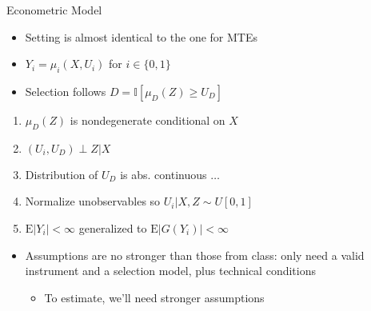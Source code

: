 \documentclass{beamer}
\newcommand{\E}{\mathrm{E}} %
\begin{document}
\begin{frame}{Econometric Model} %

\begin{itemize}

\item Setting is almost identical to the one for MTEs

\item $Y_i = \mu_i(X, U_i)$ for $i \in \{0, 1\}$

\item Selection follows $D = \mathbb{I}[ \mu_D(Z) \geq U_D ]$

\end{itemize}

\pause

\begin{enumerate}

\item $\mu_D(Z)$ is nondegenerate conditional on $X$

\item $(U_i, U_D) \perp Z | X$

\item Distribution of $U_D$ is abs. continuous $\dots$

\item Normalize unobservables so $U_i | X, Z \sim U[0, 1]$

\item $\E|Y_i| < \infty$ generalized to $\E | G(Y_i) | < \infty$

\end{enumerate}

\pause

\begin{itemize}
\item Assumptions are no stronger than those from class: only need a
  valid instrument and a selection model, plus technical conditions
\begin{itemize}
\item To estimate, we'll need stronger assumptions
\end{itemize}
\end{itemize}


\end{frame}
\end{document}
